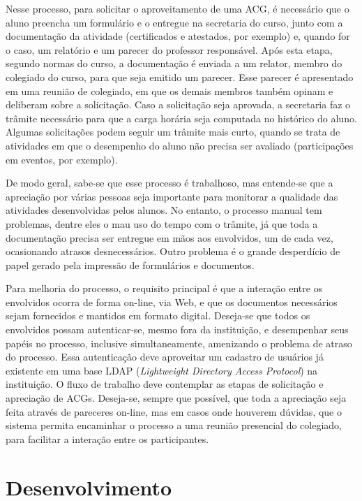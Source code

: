 \documentclass[12pt]{article}
\begin{document}
Nesse processo, para solicitar o aproveitamento de uma ACG, é necessário que o aluno preencha um formulário e o entregue na secretaria do curso, junto com a documentação da atividade (certificados e atestados, por exemplo) e, quando for o caso, um relatório e um parecer do professor responsável. Após  esta  etapa,  segundo normas do curso, a documentação é enviada a um relator, membro do colegiado do curso, para que seja emitido um parecer. Esse parecer é apresentado em uma reunião de colegiado, em que os demais membros também opinam e deliberam sobre a solicitação. Caso a solicitação seja  aprovada, a secretaria faz o trâmite necessário para que a carga horária seja computada no histórico do aluno. Algumas solicitações podem seguir um trâmite mais curto, quando se trata de atividades em que o desempenho do aluno não precisa ser avaliado (participações em eventos, por exemplo).

De modo geral, sabe-se que esse processo é trabalhoso, mas entende-se que a apreciação por várias pessoas seja importante para monitorar a qualidade das atividades desenvolvidas pelos alunos. No entanto, o processo manual tem problemas, dentre eles o mau uso do tempo com o trâmite, já que toda a documentação precisa ser entregue em mãos aos envolvidos, um de cada vez, ocasionando atrasos desnecessários. Outro problema é o grande desperdício de papel gerado pela impressão de formulários e documentos.

Para melhoria do processo, o requisito principal é que a interação entre os envolvidos ocorra de forma on-line, via Web, e que os documentos necessários sejam fornecidos e mantidos em formato digital. Deseja-se que todos os envolvidos possam autenticar-se, mesmo fora da instituição, e desempenhar seus papéis no processo, inclusive simultaneamente, amenizando o problema de atraso do processo. Essa autenticação deve aproveitar um cadastro de usuários já existente em uma base LDAP (\emph{Lightweight Directory Access Protocol}) na instituição. O fluxo de trabalho deve contemplar as etapas de solicitação e apreciação de ACGs. Deseja-se, sempre que possível, que toda a apreciação seja feita através de pareceres on-line, mas em casos onde houverem dúvidas, que o sistema permita encaminhar o processo a uma reunião presencial do colegiado, para facilitar a interação entre os participantes.

\section{Desenvolvimento}
\end{document}
